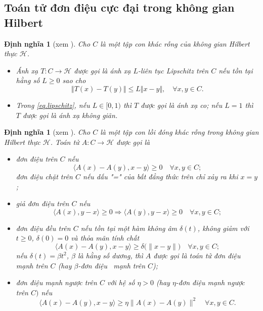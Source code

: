 \documentclass[14pt, oneside,A4paper]{book}
\theoremstyle{plain}
\newtheorem{dn}[theorem]{\bf Định nghĩa}
\begin{document}
\subsection{Toán tử đơn điệu cực đại trong không gian Hilbert}

\begin{dn}[xem \cite{AS}]\label{dnKG} \rm Cho $C$ là một tập con khác rỗng của không gian Hilbert thực $\mathcal H$.
	\begin{itemize}
		\item[$(i)$] Ánh xạ $T: C \rightarrow \mathcal H$ được gọi là ánh xạ $L$-liên tục Lipschitz trên $C$ nếu tồn tại hằng số $L \ge 0$ sao cho
		\begin{equation}\label{eq.lipschitz}
		\Vert T(x) -T(y) \Vert \leq L \Vert x - y\Vert, \quad \forall x,y \in C.
		\end{equation}
		\item[$(ii)$] Trong \eqref{eq.lipschitz}, nếu $L \in [0,1)$ thì $T$ được gọi là ánh xạ co; nếu $L=1$ thì $T$ được gọi là ánh xạ không giãn.
	\end{itemize}
\end{dn}



\begin{dn}[xem \cite{AS}] \label{dn1.13} \rm Cho $C$ là một tập con lồi đóng khác rỗng trong không gian Hilbert thực $\mathcal H$. Toán tử $A: C \rightarrow \mathcal H$ được gọi là
	\begin{itemize}
		\item[$(i)$] đơn điệu trên $C$ nếu 
		$$ \langle A(x) - A(y), x - y \rangle \geq 0\quad\forall x, y \in C;$$
		đơn điệu chặt trên $C$ nếu dấu "=" của bất đẳng thức trên chỉ xảy ra khi $x = y$;
		\item[$(ii)$] giả đơn điệu trên $C$ nếu
		$$ \langle A(x), y - x \rangle \geq 0\Rightarrow\langle A(y), y - x \rangle \geq 0\quad\forall x, y \in C;$$
		
		
		\item[$(iii)$] đơn điệu đều trên $C$ nếu tồn tại một hàm không âm $\delta (t)$, không giảm với $t \geq 0$, $\delta (0) = 0$ và thỏa mãn tính chất 
		$$
		\langle A(x) - A(y), x - y \rangle \geq \delta \big (\| x- y\| \big ) \quad \forall x, y \in C;
		$$
		nếu $\delta (t) = \beta t^2$, $\beta$ là hằng số dương, thì $A$ được gọi là toán tử đơn điệu mạnh trên $C$ (hay $\beta$-đơn điệu ~mạnh trên $C$);
		\item[$(iv)$] đơn điệu mạnh ngược trên $C$ với hệ số $\eta >0$ (hay $\eta$-đơn điệu mạnh ngược trên $C)$ nếu 
		$$
		\langle A(x) - A(y), x - y \rangle \geq \eta \| A(x)-A(y) \| ^2 \quad \forall x, y \in C.
		$$
	\end{itemize} 
\end{dn}
\end{document}
